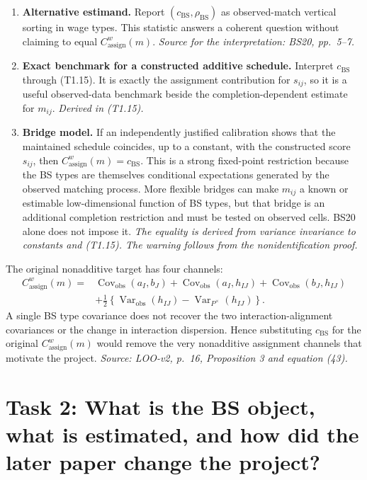 \documentclass[11pt]{article}
\begin{document}
\begin{enumerate}
\item \textbf{Alternative estimand.} Report
  \((c_{\mathrm{BS}},\rho_{\mathrm{BS}})\) as observed-match vertical sorting
  in wage types.  This statistic answers a coherent question without claiming
  to equal \(C^w_{\mathrm{assign}}(m)\).
  \textit{Source for the interpretation: BS20, pp.\ 5--7.}
\item \textbf{Exact benchmark for a constructed additive schedule.} Interpret
  \(c_{\mathrm{BS}}\) through (T1.15).  It is exactly the assignment
  contribution for \(s_{ij}\), so it is a useful observed-data benchmark
  beside the completion-dependent estimate for \(m_{ij}\).
  \textit{Derived in (T1.15).}
\item \textbf{Bridge model.} If an independently justified calibration shows
  that the maintained schedule coincides, up to a constant, with the
  constructed score \(s_{ij}\), then
  \(C^w_{\mathrm{assign}}(m)=c_{\mathrm{BS}}\).  This is a strong fixed-point
  restriction because the BS types are themselves conditional expectations
  generated by the observed matching process.  More flexible bridges can
  make \(m_{ij}\) a known or estimable low-dimensional function of BS types,
  but that bridge is an additional completion restriction and must be tested
  on observed cells.  BS20 alone does not impose it.
  \textit{The equality is derived from variance invariance to constants and
  (T1.15).  The warning follows from the nonidentification proof.}
\end{enumerate}

The original nonadditive target has four channels:
\[
\begin{aligned}
C^w_{\mathrm{assign}}(m)
={}&\operatorname{Cov}_{\mathrm{obs}}(a_I,b_J)
+\operatorname{Cov}_{\mathrm{obs}}(a_I,h_{IJ})
+\operatorname{Cov}_{\mathrm{obs}}(b_J,h_{IJ})\\
&+\frac12\left\{
\operatorname{Var}_{\mathrm{obs}}(h_{IJ})
-\operatorname{Var}_{P^\times}(h_{IJ})
\right\}.
\end{aligned}
\tag{T1.16}
\]
A single BS type covariance does not recover the two interaction-alignment
covariances or the change in interaction dispersion.  Hence substituting
\(c_{\mathrm{BS}}\) for the original \(C^w_{\mathrm{assign}}(m)\) would remove
the very nonadditive assignment channels that motivate the project.
\textit{Source: LOO-v2, p.\ 16, Proposition 3 and equation (43).}

\section{Task 2: What is the BS object, what is estimated, and how did the later paper change the project?}
\end{document}
